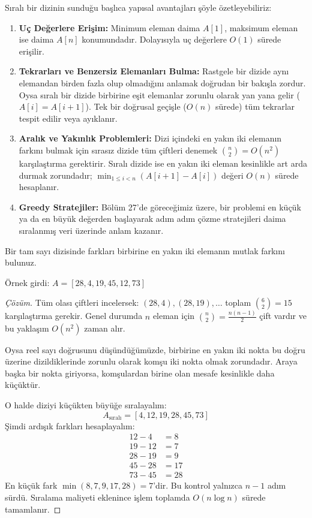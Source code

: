 Sıralı bir dizinin sunduğu başlıca yapısal avantajları şöyle özetleyebiliriz:
\begin{enumerate}
    \item \textbf{Uç Değerlere Erişim:} Minimum eleman daima $A[1]$, maksimum eleman ise daima $A[n]$ konumundadır. Dolayısıyla uç değerlere $O(1)$ sürede erişilir.
    \item \textbf{Tekrarları ve Benzersiz Elemanları Bulma:} Rastgele bir dizide aynı elemandan birden fazla olup olmadığını anlamak doğrudan bir bakışla zordur. Oysa sıralı bir dizide birbirine eşit elemanlar zorunlu olarak yan yana gelir ($A[i] = A[i+1]$). Tek bir doğrusal geçişle ($O(n)$ sürede) tüm tekrarlar tespit edilir veya ayıklanır.
    \item \textbf{Aralık ve Yakınlık Problemleri:} Dizi içindeki en yakın iki elemanın farkını bulmak için sırasız dizide tüm çiftleri denemek $\binom{n}{2} = O(n^2)$ karşılaştırma gerektirir. Sıralı dizide ise en yakın iki eleman kesinlikle art arda durmak zorundadır; $\min_{1 \le i < n} (A[i+1] - A[i])$ değeri $O(n)$ sürede hesaplanır.
    \item \textbf{Greedy Stratejiler:} Bölüm 27'de göreceğimiz üzere, bir problemi en küçük ya da en büyük değerden başlayarak adım adım çözme stratejileri daima sıralanmış veri üzerinde anlam kazanır.
\end{enumerate}

\begin{example}
Bir tam sayı dizisinde farkları birbirine en yakın iki elemanın mutlak farkını bulunuz.

Örnek girdi: $A = [28, 4, 19, 45, 12, 73]$
\end{example}

\begin{proof}[Çözüm]
Tüm olası çiftleri incelersek: $(28,4), (28,19), \dots$ toplam $\binom{6}{2} = 15$ karşılaştırma gerekir. Genel durumda $n$ eleman için $\binom{n}{2} = \frac{n(n-1)}{2}$ çift vardır ve bu yaklaşım $O(n^2)$ zaman alır. 

Oysa reel sayı doğrusunu düşündüğümüzde, birbirine en yakın iki nokta bu doğru üzerine dizildiklerinde zorunlu olarak komşu iki nokta olmak zorundadır. Araya başka bir nokta giriyorsa, komşulardan birine olan mesafe kesinlikle daha küçüktür.

O halde diziyi küçükten büyüğe sıralayalım:
\[
A_{\text{sıralı}} = [4, 12, 19, 28, 45, 73]
\]
Şimdi ardışık farkları hesaplayalım:
\begin{align*}
12 - 4 &= 8 \\
19 - 12 &= 7 \\
28 - 19 &= 9 \\
45 - 28 &= 17 \\
73 - 45 &= 28
\end{align*}
En küçük fark $\min(8, 7, 9, 17, 28) = 7$'dir. Bu kontrol yalnızca $n-1$ adım sürdü. Sıralama maliyeti eklenince işlem toplamda $O(n \log n)$ sürede tamamlanır.
\end{proof}


